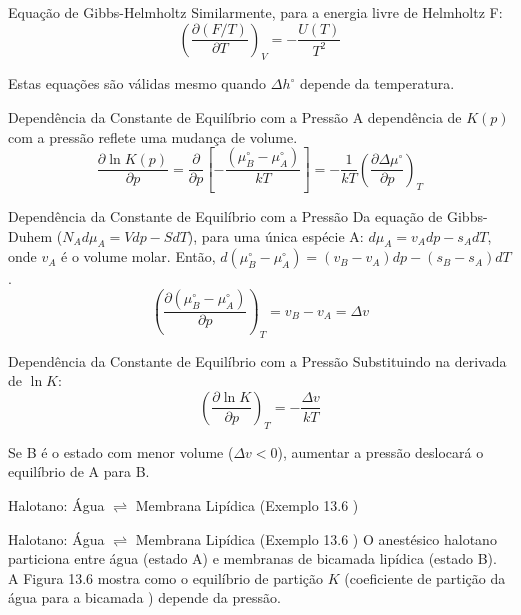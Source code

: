 \documentclass{beamer}
\begin{document}
\begin{frame}{Equação de Gibbs-Helmholtz}
    Similarmente, para a energia livre de Helmholtz F:
    $$ \left(\frac{\partial (F/T)}{\partial T}\right)_V = -\frac{U(T)}{T^2} $$
    
    Estas equações são válidas mesmo quando $\Delta h^{\circ}$ depende da temperatura.
\end{frame}

\begin{frame}{Dependência da Constante de Equilíbrio com a Pressão}
    A dependência de $K(p)$ com a pressão reflete uma mudança de volume.
    $$ \frac{\partial \ln K(p)}{\partial p} = \frac{\partial}{\partial p}\left[-\frac{(\mu_B^{\circ} - \mu_A^{\circ})}{kT}\right] = -\frac{1}{kT}\left(\frac{\partial \Delta\mu^{\circ}}{\partial p}\right)_T $$
     
\end{frame}

\begin{frame}{Dependência da Constante de Equilíbrio com a Pressão}
    Da equação de Gibbs-Duhem ($N_A d\mu_A = Vdp - SdT$), para uma única espécie A: $d\mu_A = v_A dp - s_A dT$, onde $v_A$ é o volume molar.
    Então, $d(\mu_B^{\circ} - \mu_A^{\circ}) = (v_B - v_A)dp - (s_B - s_A)dT$.
    $$ \left(\frac{\partial(\mu_B^{\circ} - \mu_A^{\circ})}{\partial p}\right)_T = v_B - v_A = \Delta v $$
     
\end{frame}

\begin{frame}{Dependência da Constante de Equilíbrio com a Pressão}
    Substituindo na derivada de $\ln K$:
    $$ \left(\frac{\partial \ln K}{\partial p}\right)_T = -\frac{\Delta v}{kT} $$
    
    Se B é o estado com menor volume ($\Delta v < 0$), aumentar a pressão deslocará o equilíbrio de A para B.
\end{frame}

\begin{frame}{Halotano: Água $\rightleftharpoons$ Membrana Lipídica (Exemplo 13.6 )}
    \begin{exampleblock}{Halotano: Água $\rightleftharpoons$ Membrana Lipídica (Exemplo 13.6 )}
        O anestésico halotano particiona entre água (estado A) e membranas de bicamada lipídica (estado B).
        A Figura 13.6 mostra como o equilíbrio de partição $K$ (coeficiente de partição da água para a bicamada ) depende da pressão.
    \end{exampleblock}
\end{frame}
\end{document}
